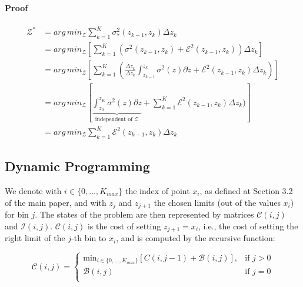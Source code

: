 \documentclass{article} %
\newcommand{\argmin}{arg\,min}
\begin{document}
\paragraph{Proof}

\begin{align}
  \mathcal{Z}^* &= \argmin_{\mathcal{Z}} \sum_{k=1}^K \sigma_*^2(z_{k-1}, z_k) \Delta z_k \\
                &= \argmin_{\mathcal{Z}} \left [ \sum_{k=1}^K (\sigma^2(z_{k-1}, z_k) + \mathcal{E}^2(z_{k-1}, z_k)) \Delta z_k \right ] \\
                & = \argmin_{\mathcal{Z}} \left [ \sum_{k=1}^K \left ( \frac{\Delta z_k}{\Delta z_k} \int_{z_{k-1}}^{z_k} \sigma^2(z) \partial z   + \mathcal{E}^2(z_{k-1}, z_k) \Delta z_k \right ) \right ] \\
                & = \argmin_{\mathcal{Z}} \left [ \underbrace{\int_{z_0}^{z_K} \sigma^2(z) \partial z}_{\text{independent of } \mathcal{Z}}   + \sum_{k=1}^K\mathcal{E}^2(z_{k-1}, z_k) \Delta z_k) \right ] \\
                & = \argmin_{\mathcal{Z}} \sum_{k=1}^K\mathcal{E}^2(z_{k-1}, z_k) \Delta z_k
  \end{align}


\subsection{Dynamic Programming}

We denote with \(i \in \{0, \ldots, K_{max}\}\) the index of point
\(x_i\), as defined at Section 3.2 of the main paper,
and with \(z_j\) and \(z_{j+1}\) the
chosen limits (out of the values \(x_i\)) for bin \(j\). The states of
the problem are then represented by matrices \(\mathcal{C}(i, j)\) and
\(\mathcal{I}(i,j)\). \(\mathcal{C}(i, j)\) is the cost of setting
\(z_{j+1}=x_i\), i.e., the cost of setting the right limit of the
\(j\)-th bin to \(x_i\), and is computed by the recursive function:

\begin{equation}
  \label{eq:recursive_cost_supp}
  \mathcal{C}(i,j) =
  \begin{cases}
    \mathrm{min}_{i \in \{0, \ldots, K_{max}\}} \left [ C(i, j-1) + \mathcal{B}(i, j) \right ], & \text{if } j > 0 \\
    \mathcal{B}(i, j) & \text{if } j = 0\\
    \end{cases}
\end{equation}
%
\end{document}
